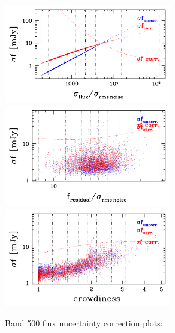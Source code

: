 \documentclass[11pt,a4paper]{article}
\begin{document}
\begin{figure}[H]
	\caption{
	    Band 500 flux uncertainty correction plots:
	}
	\includegraphics[width=0.65\textwidth]{galsim_500_dfcorr_1}
	\includegraphics[width=0.65\textwidth]{galsim_500_dfcorr_2}
	\includegraphics[width=0.65\textwidth]{galsim_500_dfcorr_3}
\end{figure}
\end{document}
